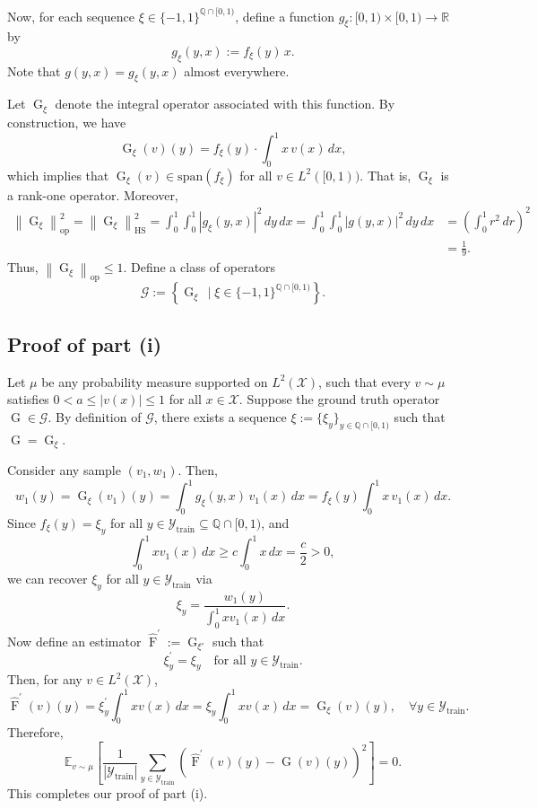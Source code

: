 \documentclass[11pt]{article}
\theoremstyle{plain}
\newcommand{\rationals}{\mathbb{Q}}
\newcommand{\Gcal}{\mathcal{G}}
\newcommand{\Xcal}{\mathcal{X}}
\newcommand{\Ycal}{\mathcal{Y}}
\newcommand{\norm}[1]{\left\lVert#1\right\rVert}
\begin{document}
Now, for each sequence $ \xi \in \{-1,1\}^{\mathbb{Q} \cap [0,1)} $, define a function $ g_{\xi} : [0,1) \times [0,1) \to \mathbb{R} $ by
\[
g_{\xi}(y, x) := f_{\xi}(y)\, x.
\]
Note that $g(y,x) = g_{\xi}(y,x)$ almost everywhere. 

Let $ \operatorname{G}_{\xi} $ denote the integral operator associated with this function.  By construction, we have
\[
\operatorname{G}_{\xi}(v)(y) = f_{\xi}(y) \cdot \int_0^1 x \,v(x)\, dx,
\]
which implies that $ \operatorname{G}_{\xi}(v) \in \text{span}(f_{\xi}) $ for all $ v \in L^2([0,1)) $. That is, $ \operatorname{G}_{\xi} $ is a rank-one operator. Moreover,
\begin{equation*}
    \begin{split}
        \norm{\operatorname{G}_{\xi}}_{\text{op}}^2 = \norm{\operatorname{G}_{\xi}}_{\text{HS}}^2 = \int_{0}^1 \int_{0}^1 |g_{\xi}(y,x)|^2\, dy\, dx = \int_{0}^1 \int_{0}^1 |g(y,x)|^2\, dy\, dx
        &= \left( \int_{0}^1 r^2\, dr\right)^2\\
        &= \frac{1}{9}.
    \end{split}
\end{equation*}
Thus, $     \norm{\operatorname{G}_{\xi}}_{\text{op}} \leq 1$. Define a class of operators
\[\Gcal := \left\{\operatorname{G}_{\xi}\, \mid \xi \in \{-1,1\}^{\rationals \cap [0,1)} \right\}.\]


\subsection{Proof of part (i)}
    

Let $ \mu $ be any probability measure supported on $ L^2(\mathcal{X}) $, such that every $ v \sim \mu $ satisfies $ 0 < a \leq |v(x)| \leq 1 $ for all $x \in \Xcal$. Suppose the ground truth operator $ \operatorname{G} \in \Gcal $. By definition of $ \Gcal $, there exists a sequence $ \xi := \{\xi_y\}_{y \in \mathbb{Q} \cap [0,1)} $ such that $ \operatorname{G} = \operatorname{G}_{\xi} $.

Consider any sample $ (v_1, w_1) $. Then,
\[
w_1(y) = \operatorname{G}_{\xi}(v_1)(y) = \int_{0}^{1} g_{\xi}(y,x)\, v_1(x)\, dx = f_{\xi}(y) \int_{0}^{1} x \, v_1(x)\, dx.
\]
Since $ f_{\xi}(y) = \xi_y $ for all $ y \in \Ycal_{\mathrm{train}} \subseteq \mathbb{Q} \cap [0,1) $, and
\[
\int_0^1 x v_1(x)\, dx \geq c \int_0^1 x\, dx = \frac{c}{2} > 0,
\]
we can recover $ \xi_y $ for all $ y \in \Ycal_{\mathrm{train}} $ via
\[
\xi_y = \frac{w_1(y)}{\int_0^1 x v_1(x)\, dx}.
\]
Now define an estimator $ \widehat{\operatorname{F}}^{\prime} := \operatorname{G}_{\xi'} $ such that
\[
\xi_y^{\prime} = \xi_y \quad \text{for all } y \in \Ycal_{\mathrm{train}}.
\]
Then, for any $ v \in L^2(\Xcal) $,
\[
\widehat{\operatorname{F}}^{\prime}(v)(y) = \xi_y^{\prime} \int_0^1 x v(x)\, dx = \xi_y \int_0^1 x v(x)\, dx = \operatorname{G}_{\xi}(v)(y), \quad \forall y \in \Ycal_{\mathrm{train}}.
\]
Therefore,
\[
\mathbb{E}_{v \sim \mu} \left[ \frac{1}{|\Ycal_{\mathrm{train}}|} \sum_{y \in \Ycal_{\mathrm{train}}} \left( \widehat{\operatorname{F}}^{\prime}(v)(y) - \operatorname{G}(v)(y) \right)^2 \right] = 0.
\]
This completes our proof of part (i).
\end{document}
